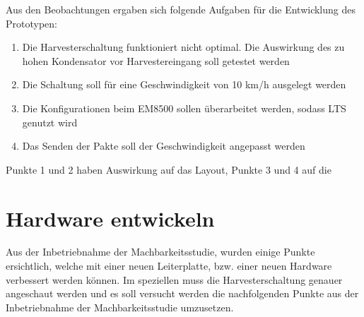 %
% 
%
%
%
Aus den Beobachtungen ergaben sich folgende Aufgaben für die Entwicklung des Prototypen:

\begin{enumerate}
    \item Die Harvesterschaltung funktioniert nicht optimal. Die Auswirkung des zu hohen Kondensator vor Harvestereingang soll getestet werden
    \item Die Schaltung soll für eine Geschwindigkeit von 10 km/h ausgelegt werden
    \item Die Konfigurationen beim EM8500 sollen überarbeitet werden, sodass LTS genutzt wird
    \item Das Senden der Pakte soll der Geschwindigkeit angepasst werden
\end{enumerate}

Punkte 1 und 2 haben Auswirkung auf das Layout, Punkte 3 und 4 auf die 








\section{Hardware entwickeln}

Aus der Inbetriebnahme der Machbarkeitsstudie, wurden einige Punkte ersichtlich, welche mit einer neuen Leiterplatte, bzw. einer neuen Hardware verbessert werden können. Im speziellen muss die Harvesterschaltung genauer angeschaut werden und es soll versucht werden die nachfolgenden Punkte aus der Inbetriebnahme der Machbarkeitsstudie umzusetzen. 

